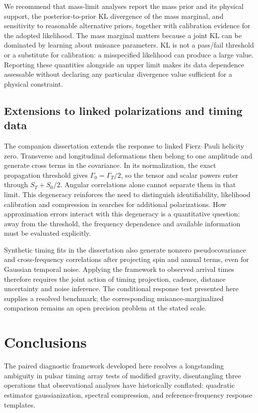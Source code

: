 \documentclass[11pt,a4paper]{article}
\begin{document}
We recommend that mass-limit analyses report the mass prior and its physical support, the posterior-to-prior KL divergence of the mass marginal, and sensitivity to reasonable alternative priors, together with calibration evidence for the adopted likelihood. The mass marginal matters because a joint KL can be dominated by learning about nuisance parameters. KL is not a pass/fail threshold or a substitute for calibration: a misspecified likelihood can produce a large value. Reporting these quantities alongside an upper limit makes its data dependence assessable without declaring any particular divergence value sufficient for a physical constraint.

\subsection{Extensions to linked polarizations and timing data}
The companion dissertation \cite{souza2026companion} extends the response to linked Fierz--Pauli helicity zero. Transverse and longitudinal deformations then belong to one amplitude and generate cross terms in the covariance. In its normalization, the exact propagation threshold gives $\Gamma_0=\Gamma_T/2$, so the tensor and scalar powers enter through $S_T+S_0/2$. Angular correlations alone cannot separate them in that limit. This degeneracy reinforces the need to distinguish identifiability, likelihood calibration and compression in searches for additional polarizations. How approximation errors interact with this degeneracy is a quantitative question: away from the threshold, the frequency dependence and available information must be evaluated explicitly.

Synthetic timing fits in the dissertation also generate nonzero pseudocovariance and cross-frequency correlations after projecting spin and annual terms, even for Gaussian temporal noise. Applying the framework to observed arrival times therefore requires the joint action of timing projection, cadence, distance uncertainty and noise inference. The conditional response test presented here supplies a resolved benchmark; the corresponding nuisance-marginalized comparison remains an open precision problem at the stated scale.

\section{Conclusions}
The paired diagnostic framework developed here resolves a longstanding ambiguity in pulsar timing array tests of modified gravity, disentangling three operations that observational analyses have historically conflated: quadratic estimator gaussianization, spectral compression, and reference-frequency response templates. 
\end{document}

